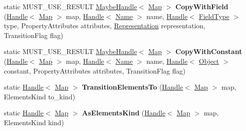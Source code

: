 \begin{DoxyCompactItemize}
\item 
static M\+U\+S\+T\+\_\+\+U\+S\+E\+\_\+\+R\+E\+S\+U\+LT \hyperlink{classv8_1_1internal_1_1_maybe_handle}{Maybe\+Handle}$<$ \hyperlink{classv8_1_1internal_1_1_map}{Map} $>$ {\bfseries Copy\+With\+Field} (\hyperlink{classv8_1_1internal_1_1_handle}{Handle}$<$ \hyperlink{classv8_1_1internal_1_1_map}{Map} $>$ map, \hyperlink{classv8_1_1internal_1_1_handle}{Handle}$<$ \hyperlink{classv8_1_1internal_1_1_name}{Name} $>$ name, \hyperlink{classv8_1_1internal_1_1_handle}{Handle}$<$ \hyperlink{classv8_1_1internal_1_1_field_type}{Field\+Type} $>$ type, Property\+Attributes attributes, \hyperlink{classv8_1_1internal_1_1_representation}{Representation} representation, Transition\+Flag flag)\hypertarget{classv8_1_1internal_1_1_map_a978a020e99da30c1fb2055d74098fce1}{}\label{classv8_1_1internal_1_1_map_a978a020e99da30c1fb2055d74098fce1}

\item 
static M\+U\+S\+T\+\_\+\+U\+S\+E\+\_\+\+R\+E\+S\+U\+LT \hyperlink{classv8_1_1internal_1_1_maybe_handle}{Maybe\+Handle}$<$ \hyperlink{classv8_1_1internal_1_1_map}{Map} $>$ {\bfseries Copy\+With\+Constant} (\hyperlink{classv8_1_1internal_1_1_handle}{Handle}$<$ \hyperlink{classv8_1_1internal_1_1_map}{Map} $>$ map, \hyperlink{classv8_1_1internal_1_1_handle}{Handle}$<$ \hyperlink{classv8_1_1internal_1_1_name}{Name} $>$ name, \hyperlink{classv8_1_1internal_1_1_handle}{Handle}$<$ \hyperlink{classv8_1_1internal_1_1_object}{Object} $>$ constant, Property\+Attributes attributes, Transition\+Flag flag)\hypertarget{classv8_1_1internal_1_1_map_abd8b707bb91975d044d1576026983700}{}\label{classv8_1_1internal_1_1_map_abd8b707bb91975d044d1576026983700}

\item 
static \hyperlink{classv8_1_1internal_1_1_handle}{Handle}$<$ \hyperlink{classv8_1_1internal_1_1_map}{Map} $>$ {\bfseries Transition\+Elements\+To} (\hyperlink{classv8_1_1internal_1_1_handle}{Handle}$<$ \hyperlink{classv8_1_1internal_1_1_map}{Map} $>$ map, Elements\+Kind to\+\_\+kind)\hypertarget{classv8_1_1internal_1_1_map_a401e96aac7c58536324d566b3502a3cf}{}\label{classv8_1_1internal_1_1_map_a401e96aac7c58536324d566b3502a3cf}

\item 
static \hyperlink{classv8_1_1internal_1_1_handle}{Handle}$<$ \hyperlink{classv8_1_1internal_1_1_map}{Map} $>$ {\bfseries As\+Elements\+Kind} (\hyperlink{classv8_1_1internal_1_1_handle}{Handle}$<$ \hyperlink{classv8_1_1internal_1_1_map}{Map} $>$ map, Elements\+Kind kind)\hypertarget{classv8_1_1internal_1_1_map_a15e6d5907827dda6c7abb49bb075ef5c}{}\label{classv8_1_1internal_1_1_map_a15e6d5907827dda6c7abb49bb075ef5c}


\end{DoxyCompactItemize}
